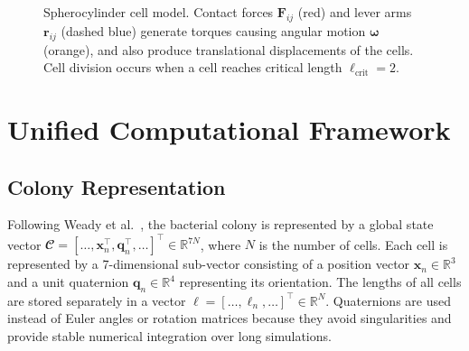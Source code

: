 \documentclass[conference]{IEEEtran}
\begin{document}
\begin{figure}[H]
    \caption{Spherocylinder cell model. Contact forces $\mathbf{F}_{ij}$ (red) and lever arms $\mathbf{r}_{ij}$ (dashed blue) generate torques causing angular motion $\boldsymbol{\omega}$ (orange), and also produce translational displacements of the cells. Cell division occurs when a cell reaches critical length $\ell_{\text{crit}} = 2$.}
    \label{fig:spherocylinder_model}

\end{figure}

\newpage

\section{Unified Computational Framework}

\subsection{Colony Representation}

Following Weady et al.~\cite{Weady2024SM}, the bacterial colony is represented by a global state vector $\mathbfcal{C} = [\dots, \mathbf{x}_n^\top, \mathbf{q}_n^\top, \dots]^\top \in \mathbb{R}^{7N}$, where $N$ is the number of cells. Each cell is represented by a 7-dimensional sub-vector consisting of a position vector $\mathbf{x}_n \in \mathbb{R}^3$ and a unit quaternion $\mathbf{q}_n \in \mathbb{R}^4$ representing its orientation. The lengths of all cells are stored separately in a vector $\boldsymbol{\ell} = [\dots, \ell_n, \dots]^\top \in \mathbb{R}^{N}$. Quaternions are used instead of Euler angles or rotation matrices because they avoid singularities and provide stable numerical integration over long simulations.
\end{document}
